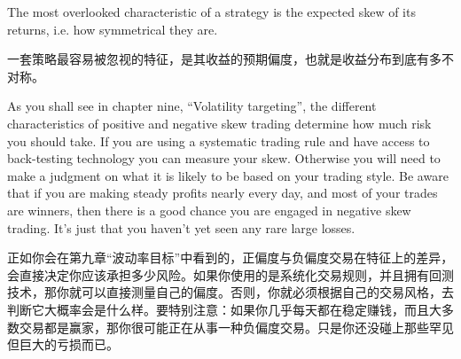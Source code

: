 
\begin{englishblock} The most overlooked characteristic of a strategy is the expected skew of its returns, i.e. how symmetrical they are. \end{englishblock}

\begin{chineseblock}一套策略最容易被忽视的特征，是其收益的预期偏度，也就是收益分布到底有多不对称。\end{chineseblock}

\bipairgap

\begin{englishblock} As you shall see in chapter nine, ``Volatility targeting'', the different characteristics of positive and negative skew trading determine how much risk you should take. If you are using a systematic trading rule and have access to back-testing technology you can measure your skew. Otherwise you will need to make a judgment on what it is likely to be based on your trading style. Be aware that if you are making steady profits nearly every day, and most of your trades are winners, then there is a good chance you are engaged in negative skew trading. It's just that you haven't yet seen any rare large losses. \end{englishblock}

\begin{chineseblock}正如你会在第九章“波动率目标”中看到的，正偏度与负偏度交易在特征上的差异，会直接决定你应该承担多少风险。如果你使用的是系统化交易规则，并且拥有回测技术，那你就可以直接测量自己的偏度。否则，你就必须根据自己的交易风格，去判断它大概率会是什么样。要特别注意：如果你几乎每天都在稳定赚钱，而且大多数交易都是赢家，那你很可能正在从事一种负偏度交易。只是你还没碰上那些罕见但巨大的亏损而已。\end{chineseblock}

